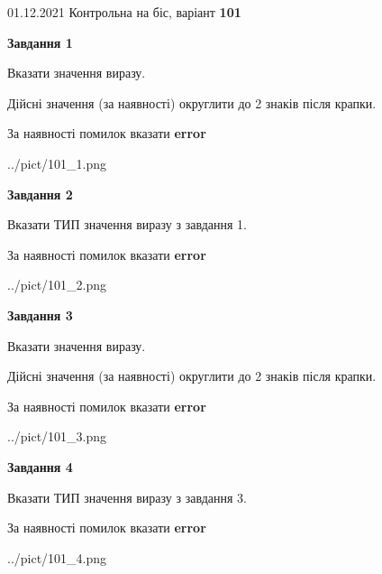 \documentclass[11pt, ukrainian]{article}
\begin{document}
{01.12.2021 Контрольна на біс, варіант  \No \textbf { 101 }\par}
{
\begin {large}
{\begin {center}\textbf{Завдання 1}\end {center}}\par
Вказати значення виразу. \par
Дійсні значення (за наявності) округлити до 2 знаків після крапки. \par
За наявності помилок вказати \textbf{error}

\begin{center}
	{../pict/101_1.png}
\end{center}
\newpage

{\begin {center}\textbf{Завдання 2}\end {center}}\par
Вказати ТИП значення виразу з завдання 1. \par
За наявності помилок вказати \textbf{error}

\begin{center}
	{../pict/101_2.png}
\end{center}
\newpage

{\begin {center}\textbf{Завдання 3}\end {center}}\par
Вказати значення виразу. \par
Дійсні значення (за наявності) округлити до 2 знаків після крапки. \par
За наявності помилок вказати \textbf{error}

\begin{center}
	{../pict/101_3.png}
\end{center}
\newpage

{\begin {center}\textbf{Завдання 4}\end {center}}\par
Вказати ТИП значення виразу з завдання 3. \par
За наявності помилок вказати \textbf{error}

\begin{center}
	{../pict/101_4.png}
\end{center}
\newpage


\end{large}}
\end{document}
